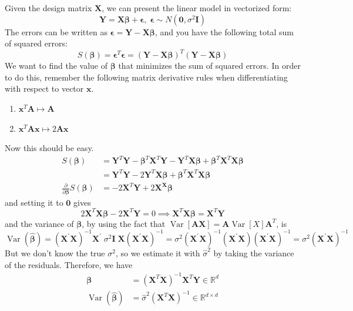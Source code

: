 \documentclass{article}
\DeclareMathOperator{\Var}{Var}
\theoremstyle{definition}
\begin{document}
  Given the design matrix $\mathbf{X}$, we can present the linear model in vectorized form: 
  \[\mathbf{Y} = \mathbf{X} \boldsymbol{\beta} + \boldsymbol{\epsilon}, \; \boldsymbol{\epsilon} \sim N(\mathbf{0}, \sigma^2 \mathbf{I})\]
  The errors can be written as $\boldsymbol{\epsilon} = \mathbf{Y} - \mathbf{X} \boldsymbol{\beta}$, and you have the following total sum of squared errors: 
  \[S(\boldsymbol{\beta}) = \boldsymbol{\epsilon}^T \boldsymbol{\epsilon} = (\mathbf{Y} - \mathbf{X} \boldsymbol{\beta})^T (\mathbf{Y} - \mathbf{X} \boldsymbol{\beta})\]
  We want to find the value of $\boldsymbol{\beta}$ that minimizes the sum of squared errors. In order to do this, remember the following matrix derivative rules when differentiating with respect to vector $\mathbf{x}$. 
  \begin{enumerate}
      \item $\mathbf{x}^T \mathbf{A} \mapsto \mathbf{A}$
      \item $\mathbf{x}^T \mathbf{A} \mathbf{x} \mapsto 2 \mathbf{A} \mathbf{x}$
  \end{enumerate}
  Now this should be easy. 
  \begin{align*}
      S(\boldsymbol{\beta}) & = \mathbf{Y}^T \mathbf{Y} - \boldsymbol{\beta}^T \mathbf{X}^T \mathbf{Y} - \mathbf{Y}^T \mathbf{X} \boldsymbol{\beta} + \boldsymbol{\beta}^T \mathbf{X}^T \mathbf{X} \boldsymbol{\beta} \\
      & = \mathbf{Y}^T \mathbf{Y} - 2 \mathbf{Y}^T \mathbf{X} \boldsymbol{\beta} + \boldsymbol{\beta}^T \mathbf{X}^T \mathbf{X} \boldsymbol{\beta} \\
      \frac{\partial}{\partial \boldsymbol{\beta}} S(\boldsymbol{\beta}) & = - 2 \mathbf{X}^T \mathbf{Y} + 2 \mathbf{X}^ \mathbf{X} \boldsymbol{\beta}
  \end{align*}
  and setting it to $\mathbf{0}$ gives 
  \[2 \mathbf{X}^T \mathbf{X} \boldsymbol{\beta} - 2 \mathbf{X}^T \mathbf{Y} = 0 \implies \mathbf{X}^T \mathbf{X} \boldsymbol{\beta} = \mathbf{X}^T \mathbf{Y}\]
  and the variance of $\boldsymbol{\beta}$, by using the fact that $\Var[\mathbf{A} \mathbf{X}] = \mathbf{A} \Var[X] \mathbf{A}^T$, is
  \[\Var(\hat{\boldsymbol{\beta}}) =
   (\mathbf{X}^{\prime} \mathbf{X})^{-1} \mathbf{X}^{\prime}
   \;\sigma^2 \mathbf{I} \; \mathbf{X}  (\mathbf{X}^{\prime} \mathbf{X})^{-1}
  = \sigma^2 (\mathbf{X}^{\prime} \mathbf{X})^{-1} (\mathbf{X}^{\prime}
   \mathbf{X})  (\mathbf{X}^{\prime} \mathbf{X})^{-1}
  = \sigma^2  (\mathbf{X}^{\prime} \mathbf{X})^{-1}\]
  But we don't know the true $\sigma^2$, so we estimate it with $\hat{\sigma}^2$ by taking the variance of the residuals. Therefore, we have 
  \begin{align*}
      \boldsymbol{\beta} & = (\mathbf{X}^T \mathbf{X})^{-1} \mathbf{X}^T \mathbf{Y} \in \mathbb{R}^d \\
      \Var(\hat{\boldsymbol{\beta}}) & = \hat{\sigma}^2 (\mathbf{X}^T \mathbf{X})^{-1} \in \mathbb{R}^{d \times d}
  \end{align*}
\end{document}
